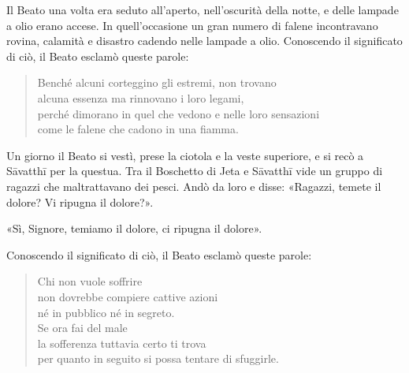 
 Il Beato una volta era seduto all’aperto, nell’oscurità
della notte, e delle lampade a olio erano accese. In quell’occasione un gran
numero di falene incontravano rovina, calamità e disastro cadendo nelle lampade
a olio. Conoscendo il significato di ciò, il Beato esclamò queste parole:

\begin{quote}
Benché alcuni corteggino gli estremi, non trovano \\
alcuna essenza ma rinnovano i loro legami, \\
perché dimorano in quel che vedono e nelle loro sensazioni \\
come le falene che cadono in una fiamma.
\end{quote}


Un giorno il Beato si vestì, prese la ciotola e la veste superiore, e si recò a
Sāvatthī per la questua. Tra il Boschetto di Jeta e Sāvatthī vide un gruppo di
ragazzi che maltrattavano dei pesci. Andò da loro e disse: «Ragazzi, temete il
dolore? Vi ripugna il dolore?».

«Sì, Signore, temiamo il dolore, ci ripugna il dolore».

Conoscendo il significato di ciò, il Beato esclamò queste parole:

\begin{quote}
Chi non vuole soffrire \\
non dovrebbe compiere cattive azioni \\
né in pubblico né in segreto. \\
Se ora fai del male \\
la sofferenza tuttavia certo ti trova \\
per quanto in seguito si possa tentare di sfuggirle.
\end{quote}


